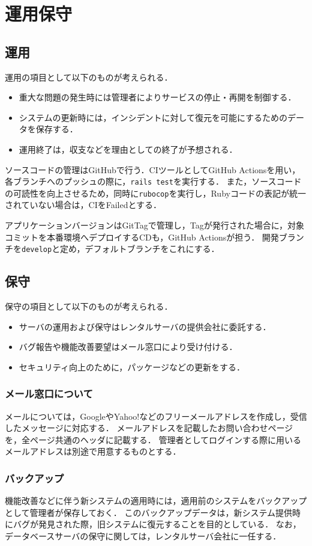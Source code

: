 \chapter{運用保守}
\section{運用}
運用の項目として以下のものが考えられる．
\begin{itemize}
    \item 重大な問題の発生時には管理者によりサービスの停止・再開を制御する．
    \item システムの更新時には，インシデントに対して復元を可能にするためのデータを保存する．
    \item 運用終了は，収支などを理由としての終了が予想される．
\end{itemize}
ソースコードの管理はGitHubで行う．CIツールとしてGitHub Actionsを用い，各ブランチへのプッシュの際に，\texttt{rails test}を実行する．
また，ソースコードの可読性を向上させるため，同時に\texttt{rubocop}を実行し，Rubyコードの表記が統一されていない場合は，CIをFailedとする．\par
アプリケーションバージョンはGitTagで管理し，Tagが発行された場合に，対象コミットを本番環境へデプロイするCDも，GitHub Actionsが担う．
開発ブランチを\texttt{develop}と定め，デフォルトブランチをこれにする．
\section{保守}
保守の項目として以下のものが考えられる．
\begin{itemize}
    \item サーバの運用および保守はレンタルサーバの提供会社に委託する．
    \item バグ報告や機能改善要望はメール窓口により受け付ける．
    \item セキュリティ向上のために，パッケージなどの更新をする．
\end{itemize}
\subsection*{メール窓口について}
メールについては，GoogleやYahoo!などのフリーメールアドレスを作成し，受信したメッセージに対応する．
メールアドレスを記載したお問い合わせページを，全ページ共通のヘッダに記載する．
管理者としてログインする際に用いるメールアドレスは別途で用意するものとする．
\subsection*{バックアップ}
機能改善などに伴う新システムの適用時には，適用前のシステムをバックアップとして管理者が保存しておく．
このバックアップデータは，新システム提供時にバグが発見された際，旧システムに復元することを目的としている．
なお，データベースサーバの保守に関しては，レンタルサーバ会社に一任する．

